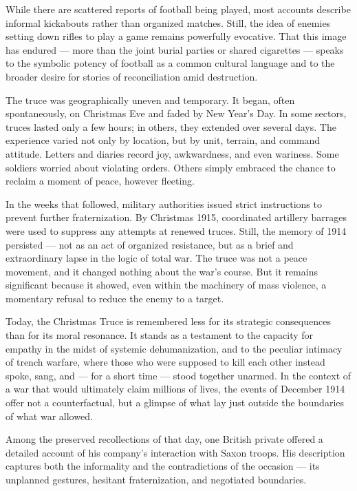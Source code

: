While there are scattered reports of football being played, most accounts describe informal kickabouts rather than organized matches. Still, the idea of enemies setting down rifles to play a game remains powerfully evocative. That this image has endured — more than the joint burial parties or shared cigarettes — speaks to the symbolic potency of football as a common cultural language and to the broader desire for stories of reconciliation amid destruction.

The truce was geographically uneven and temporary. It began, often spontaneously, on Christmas Eve and faded by New Year’s Day. In some sectors, truces lasted only a few hours; in others, they extended over several days. The experience varied not only by location, but by unit, terrain, and command attitude. Letters and diaries record joy, awkwardness, and even wariness. Some soldiers worried about violating orders. Others simply embraced the chance to reclaim a moment of peace, however fleeting.

In the weeks that followed, military authorities issued strict instructions to prevent further fraternization. By Christmas 1915, coordinated artillery barrages were used to suppress any attempts at renewed truces. Still, the memory of 1914 persisted — not as an act of organized resistance, but as a brief and extraordinary lapse in the logic of total war. The truce was not a peace movement, and it changed nothing about the war’s course. But it remains significant because it showed, even within the machinery of mass violence, a momentary refusal to reduce the enemy to a target.

Today, the Christmas Truce is remembered less for its strategic consequences than for its moral resonance. It stands as a testament to the capacity for empathy in the midst of systemic dehumanization, and to the peculiar intimacy of trench warfare, where those who were supposed to kill each other instead spoke, sang, and — for a short time — stood together unarmed. In the context of a war that would ultimately claim millions of lives, the events of December 1914 offer not a counterfactual, but a glimpse of what lay just outside the boundaries of what war allowed.

Among the preserved recollections of that day, one British private offered a detailed account of his company’s interaction with Saxon troops. His description captures both the informality and the contradictions of the occasion — its unplanned gestures, hesitant fraternization, and negotiated boundaries.

